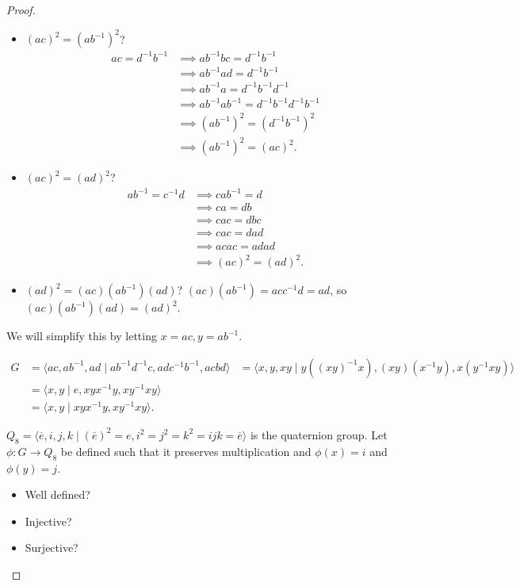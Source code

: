 \documentclass[12pt, psamsfonts]{amsart}
\theoremstyle{definition}
\theoremstyle{remark}
\numberwithin{equation}{section}
\begin{document}
\begin{proof}
  \begin{itemize}
    \item
      $(ac)^2 = (ab^{-1})^2$?
      \begin{align*}
        ac = d^{-1}b^{-1}
          &\implies ab^{-1}bc = d^{-1}b^{-1} \\
          &\implies ab^{-1}ad = d^{-1}b^{-1} \\
          &\implies ab^{-1}a = d^{-1}b^{-1}d^{-1} \\
          &\implies ab^{-1}ab^{-1} = d^{-1}b^{-1}d^{-1}b^{-1} \\
          &\implies (ab^{-1})^2 = (d^{-1}b^{-1})^2 \\
          &\implies (ab^{-1})^2 = (ac)^2.
      \end{align*}
    \item
      $(ac)^2 = (ad)^2$?
      \begin{align*}
        ab^{-1} = c^{-1}d
          &\implies cab^{-1} = d \\
          &\implies ca = db \\
          &\implies cac = dbc \\
          &\implies cac = dad \\
          &\implies acac = adad \\
          &\implies (ac)^2 = (ad)^2.
      \end{align*}
    \item
      $(ad)^2 = (ac)(ab^{-1})(ad)$?
      $(ac)(ab^{-1}) = acc^{-1}d = ad$, so $(ac)(ab^{-1})(ad) = (ad)^2$.
  \end{itemize}
  We will simplify this by letting $x = ac, y = ab^{-1}$.

  \begin{align*}
    G &= \langle ac, ab^{-1}, ad \mid ab^{-1}d^{-1}c, adc^{-1}b^{-1}, acbd \rangle
      &= \langle x, y, xy \mid y((xy)^{-1}x), (xy)(x^{-1}y), x(y^{-1}xy) \rangle \\
      &= \langle x, y \mid e, xyx^{-1}y, xy^{-1}xy \rangle \\
      &= \langle x, y \mid xyx^{-1}y, xy^{-1}xy \rangle.
  \end{align*}

  $Q_8 = \langle \overline{e}, i, j, k \mid (\overline{e})^2 = e, i^2 = j^2 = k^2 = ijk = \overline{e} \rangle$ is the quaternion group.
  Let $\phi: G \rightarrow Q_8$ be defined such that it preserves multiplication and $\phi(x) = i$ and $\phi(y) = j$.

  \begin{itemize}
    \item
      Well defined?
    \item
      Injective?
    \item
      Surjective?
  \end{itemize}
  
\end{proof}
\end{document}
